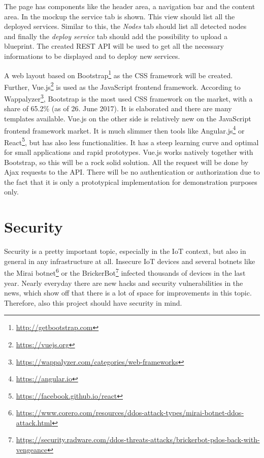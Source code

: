 The page has components like the header area, a navigation bar and the content area.
In the mockup the service tab is shown.
This view should list all the deployed services.
Similar to this, the \textit{Nodes} tab should list all detected nodes and finally the \textit{deploy service} tab should add the possibility to upload a blueprint.
The created \ac{REST} \ac{API} will be used to get all the necessary informations to be displayed and to deploy new services.

A web layout based on Bootstrap\footnote{\url{http://getbootstrap.com}} as the \ac{CSS} framework will be created.
Further, Vue.js\footnote{\url{https://vuejs.org}} is used as the JavaScript frontend framework.
According to Wappalyzer\footnote{\url{https://wappalyzer.com/categories/web-frameworks}}, Bootstrap is the most used \ac{CSS} framework on the market, with a share of 65.2\% (as of 26. June 2017).
It is elaborated and there are many templates available.
Vue.js on the other side is relatively new on the JavaScript frontend framework market.
It is much slimmer then tools like Angular.js\footnote{\url{https://angular.io}} or React\footnote{\url{https://facebook.github.io/react}}, but has also less functionalities.
It has a steep learning curve and optimal for small applications and rapid prototypes.
Vue.js works natively together with Bootstrap, so this will be a rock solid solution.
All the request will be done by Ajax requests to the \ac{API}.
There will be no authentication or authorization due to the fact that it is only a prototypical implementation for demonstration purposes only.


\section{Security}
Security is a pretty important topic, especially in the \ac{IoT} context, but also in general in any infrastructure at all.
Insecure \ac{IoT} devices and several botnets like the Mirai botnet\footnote{\url{https://www.corero.com/resources/ddos-attack-types/mirai-botnet-ddos-attack.html}} or the BrickerBot\footnote{\url{https://security.radware.com/ddos-threats-attacks/brickerbot-pdos-back-with-vengeance}} infected thousands of devices in the last year.
Nearly everyday there are new hacks and security vulnerabilities in the news, which show off that there is a lot of space for improvements in this topic.
Therefore, also this project should have security in mind.

